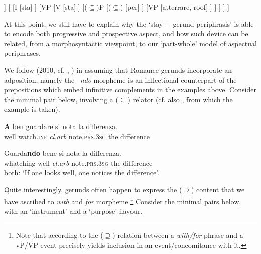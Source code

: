 \documentclass[output=paper,modfonts,nonflat,newtxmath,colorlinks,citecolor=brown]{langsci/langscibook}
\begin{document}
    

   
  \ea  \label{ex:franco:26}
    \begin{forest}
    [IP
    		[DP
    			[l'aereo]
    		]
    		[
    			[I
    				[sta]
    			]
    			[VP
    				[V
    					[\sout{sta}]
    				]	
    				[($\subseteq$)P
    					[($\subseteq$)
    						[per]
    					]
    					[VP
    						[atterrare, roof]
    					]
    				]
    			]
    		]
    	]
    	\end{forest}
    \z
                                                                          

At this point, we still have to explain why the ‘stay + gerund periphrasis’ is able to encode both progressive and prospective aspect, and how such device can be related, from a morphosyntactic viewpoint, to our ‘part-whole’ model of aspectual periphrases.

We follow \citeauthor{Gallego2010} (2010, cf. \citealt{Mateu2002}, \citealt{Franco2015}) in assuming that Romance gerunds incorporate an adposition, namely the –\textit{ndo} morpheme is an inflectional counterpart of the prepositions which embed infinitive complements in the examples above. Consider the minimal pair below, involving a (${\subseteq}$) relator (cf. also \citealt{Casalicchio2013}, from which the example  is taken). %

\ea%
    \label{ex:franco:27}
    \ea \label{ex:franco:27a}
    \gll \textbf{A} ben guardare si nota la differenza.\\
         well watch.\textsc{inf} \textit{cl.arb} note.\textsc{prs.3sg} the difference\\
    \glt
    
     \ex \label{ex:franco:27b}
    \gll  Guarda\textbf{ndo} bene si nota la differenza.\\
       whatching well \textit{cl.arb} note.\textsc{prs.3sg} the difference\\
    \glt both: `If one looks well, one notices the difference’.
    \z
    \z

 

Quite interestingly, gerunds often happen to express the (${\supseteq}$) content that we have ascribed to \textit{with} and \textit{for} morpheme.\footnote{Note that according to \citealt{FrancoManzini2017Ins} the (\textrm{${\supseteq}$}) relation between a \textit{with/for} phrase and a vP/VP event precisely yields inclusion in an event/concomitance with it.} Consider the minimal pairs below, with an ‘instrument’  and a ‘purpose’  flavour.
\end{document}
